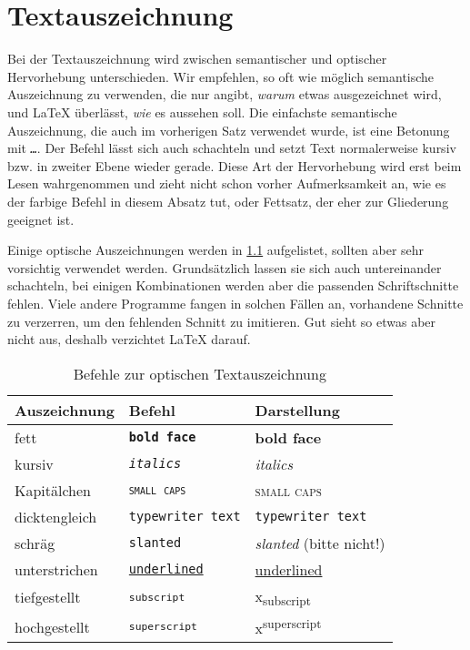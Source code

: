 \chapter{Textauszeichnung}

Bei der Textauszeichnung wird zwischen semantischer und optischer Hervorhebung unterschieden.
Wir empfehlen, so oft wie möglich semantische Auszeichnung zu verwenden, die nur angibt, \emph{warum} etwas ausgezeichnet wird, und \LaTeX{} überlässt, \emph{wie} es aussehen soll.
Die einfachste semantische Auszeichnung, die auch im vorherigen Satz verwendet wurde, ist eine Betonung mit \texttt{\emph{…}}.
Der Befehl lässt sich auch schachteln und setzt Text normalerweise kursiv bzw. in zweiter Ebene wieder gerade.
Diese Art der Hervorhebung wird erst beim Lesen wahrgenommen und zieht nicht schon vorher Aufmerksamkeit an, wie es der farbige Befehl in diesem Absatz tut, oder Fettsatz, der eher zur Gliederung geeignet ist.

Einige optische Auszeichnungen werden in \cref{tbl:visual-markup} aufgelistet, sollten aber sehr vorsichtig verwendet werden.
Grundsätzlich lassen sie sich auch untereinander schachteln, bei einigen Kombinationen werden aber die passenden Schriftschnitte fehlen.
Viele andere Programme fangen in solchen Fällen an, vorhandene Schnitte zu verzerren, um den fehlenden Schnitt zu imitieren.
Gut sieht so etwas aber nicht aus, deshalb verzichtet \LaTeX{} darauf.

\begin{table}[H]
	\center
	\begin{tabular}{lll}
		\toprule
		Auszeichnung & Befehl & Darstellung \\
		\midrule
		fett & \texttt{\textbf{bold face}} & \textbf{bold face} \\
		kursiv & \texttt{\textit{italics}} & \textit{italics} \\
		Kapitälchen & \texttt{\textsc{small caps}} & \textsc{small caps} \\
		dicktengleich & \texttt{\texttt{typewriter text}} & \texttt{typewriter text} \\
		schräg & \texttt{\texttt{slanted}} & \textsl{slanted} (bitte nicht!) \\
		unterstrichen & \texttt{\underline{underlined}} & \underline{underlined} \\
		tiefgestellt & \texttt{\textsubscript{subscript}} & x\textsubscript{subscript} \\
		hochgestellt & \texttt{\textsubscript{superscript}} & x\textsuperscript{superscript} \\
		\bottomrule
	\end{tabular}
	\caption{Befehle zur optischen Textauszeichnung}
	\label{tbl:visual-markup}
\end{table}

